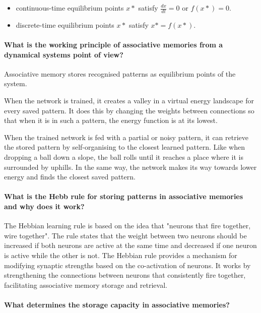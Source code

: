 \begin{itemize}
    \item continuous-time equilibrium points $x*$ satisfy $\frac{dx}{dt} = 0$ or $f(x*) = 0$.
    \item discrete-time equilibrium points $x*$ satisfy $x* = f(x*)$.
\end{itemize}

\paragraph{What is the working principle of associative memories from a dynamical systems point of view?}

Associative memory stores recognised patterns as equilibrium points of the system.

When the network is trained, it creates a valley in a virtual energy landscape for every saved pattern.
It does this by changing the weights between connections so that when it is in such a pattern, the energy function is at its lowest.

When the trained network is fed with a partial or noisy pattern,
it can retrieve the stored pattern by self-organising to the closest learned pattern.
Like when dropping a ball down a slope, the ball rolls until it reaches a place where it is surrounded by uphills.
In the same way, the network makes its way towards lower energy and finds the closest saved pattern.

\paragraph{What is the Hebb rule for storing patterns in associative memories and why does it work?}

The Hebbian learning rule is based on the idea that "neurons that fire together, wire together". The
rule states that the weight between two neurons should be increased if both neurons are active at the
same time and decreased if one neuron is active while the other is not. The Hebbian rule provides a
mechanism for modifying synaptic strengths based on the co-activation of neurons. It works by
strengthening the connections between neurons that consistently fire together, facilitating associative
memory storage and retrieval.

\paragraph{What determines the storage capacity in associative memories?}

